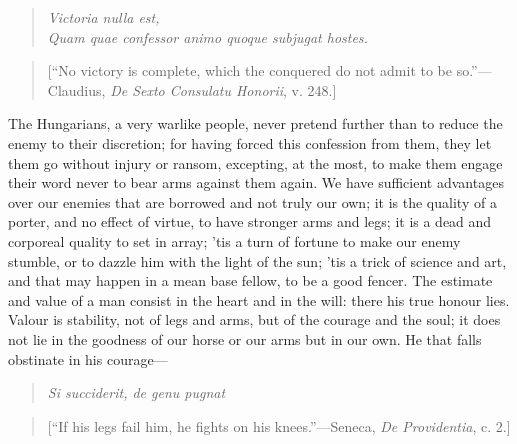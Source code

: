 \documentclass[twocolumn]{article}
\begin{document}
	\begin{quote}
		\noindent\emph{Victoria nulla est,}\\
			\emph{Quam quae confessor animo quoque subjugat hostes.}
	\end{quote}
		
	\begin{quote}
		[``No victory is complete, which the conquered do not admit to be so.''---Claudius, \emph{De Sexto Consulatu Honorii}, v. 248.]
	\end{quote}
	
	The Hungarians, a very warlike people, never pretend further than to reduce the enemy to their discretion; for having forced this confession from them, they let them go without injury or ransom, excepting, at the most, to make them engage their word never to bear arms against them again. We have sufficient advantages over our enemies that are borrowed and not truly our own; it is the quality of a porter, and no effect of virtue, to have stronger arms and legs; it is a dead and corporeal quality to set in array; ’tis a turn of fortune to make our enemy stumble, or to dazzle him with the light of the sun; ’tis a trick of science and art, and that may happen in a mean base fellow, to be a good fencer. The estimate and value of a man consist in the heart and in the will: there his true honour lies. Valour is stability, not of legs and arms, but of the courage and the soul; it does not lie in the goodness of our horse or our arms but in our own. He that falls obstinate in his courage---

	\begin{quote}
		\noindent\emph{Si succiderit, de genu pugnat}
	\end{quote}
	
	\begin{quote}
		[``If his legs fail him, he fights on his knees.''---Seneca, \emph{De Providentia}, c. 2.]
	\end{quote}
	
\end{document}
